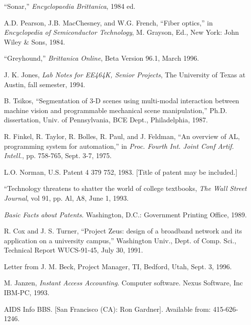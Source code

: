 {\begin{thebibliography}{}

“Sonar,” \emph{Encyclopaedia Brittanica}, 1984 ed.

A.D. Pearson, J.B. MacChesney, and W.G. French, “Fiber optics,” in \emph{Encyclopedia of Semiconductor Technology}, M. Grayson, Ed., New York: John Wiley \& Sons, 1984.

“Greyhound,” \emph{Brittanica Online}, Beta Version 96.1, March 1996.

J. K. Jones, \emph{Lab Notes for EE464K, Senior Projects}, The University of Texas at Austin, fall semester, 1994.

B. Tsikos, “Segmentation of 3-D scenes using multi-modal interaction between machine vision and programmable mechanical scene manipulation,” Ph.D.
dissertation, Univ. of Pennsylvania, BCE Dept., Philadelphia, 1987.

R. Finkel, R. Taylor, R. Bolles, R. Paul, and J. Feldman, “An overview of AL, programming system for automation,” in \emph{Proc. Fourth Int. Joint Conf Artif. Intell.}, pp. 758-765, Sept. 3-7, 1975.

L.O. Norman, U.S. Patent 4 379 752, 1983. [Title of patent may be included.]

“Technology threatens to shatter the world of college textbooks, \emph{The Wall Street Journal}, vol 91, pp. Al, A8, June 1, 1993.

\emph{Basic Facts about Patents}. Washington, D.C.: Government Printing Office, 1989.

R. Cox and J. S. Turner, “Project Zeus: design of a broadband network and its
application on a university campus,” Washington Univ., Dept. of Comp. Sci.,
Technical Report WUCS-91-45, July 30, 1991.


Letter from J. M. Beck, Project Manager, TI, Bedford, Utah, Sept. 3, 1996.

M. Janzen, \emph{Instant Access Accounting}. Computer software. Nexus Software, Inc IBM-PC, 1993.


AIDS Info BBS. [San Francisco (CA): Ron Gardner]. Available from: 415-626-1246.


\end{thebibliography}}
